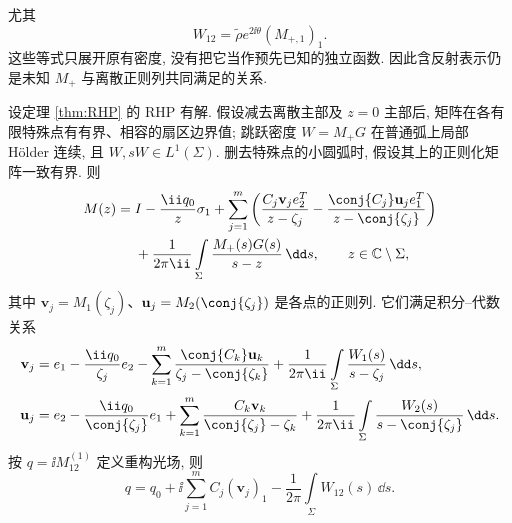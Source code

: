尤其
\[
W_{12}=\widetilde\rho e^{2\ii\theta}(M_{+,1})_1.
\]
这些等式只展开原有密度, 没有把它当作预先已知的独立函数.
因此含反射表示仍是未知 $M_+$ 与离散正则列共同满足的关系.
\begin{proposition}[含反射的留数积分表示]\label{prop:cauchy-representation}
设定理 \ref{thm:RHP} 的 RHP 有解. 假设减去离散主部及 $z=0$ 主部后, 矩阵在各有限特殊点有有界、相容的扇区边界值; 跳跃密度 $W=M_+G$ 在普通弧上局部 Hölder 连续, 且 $W,sW\in L^1(\Sigma)$. 删去特殊点的小圆弧时, 假设其上的正则化矩阵一致有界. 则
\begin{equation}\label{eq:general-cauchy}
\begin{aligned}
M(z)={}&I-\dfrac{\ii q_0}{z}\sigma_1
+\sum\limits_{j=1}^{m}\left(
\dfrac{C_j\mathbf v_je_2^T}{z-\zeta_j}
-\dfrac{\conj{C_j}\mathbf u_je_1^T}{z-\conj{\zeta_j}}\right)\\
&+\dfrac{1}{2\pi\ii}\int\limits_\Sigma\dfrac{M_+(s)G(s)}{s-z}\,\dd s,
\qquad z\in\mathbb C\mathbin{\backslash}\Sigma,
\end{aligned}
\end{equation}
其中 $\mathbf v_j=M_1(\zeta_j)$、$\mathbf u_j=M_2(\conj{\zeta_j})$ 是各点的正则列. 它们满足积分--代数关系
\begin{align}
\mathbf v_j={}&e_1-\dfrac{\ii q_0}{\zeta_j}e_2
-\sum\limits_{k=1}^{m}\dfrac{\conj{C_k}\mathbf u_k}{\zeta_j-\conj{\zeta_k}}
+\dfrac{1}{2\pi\ii}\int\limits_\Sigma\dfrac{W_1(s)}{s-\zeta_j}\,\dd s,
\label{eq:general-finite1}\\
\mathbf u_j={}&e_2-\dfrac{\ii q_0}{\conj{\zeta_j}}e_1
+\sum\limits_{k=1}^{m}\dfrac{C_k\mathbf v_k}{\conj{\zeta_j}-\zeta_k}
+\dfrac{1}{2\pi\ii}\int\limits_\Sigma\dfrac{W_2(s)}{s-\conj{\zeta_j}}\,\dd s.
\label{eq:general-finite2}
\end{align}
按 $q=\ii M^{(1)}_{12}$ 定义重构光场, 则
\begin{equation}\label{eq:qgeneral}
q=q_0+\ii\sum\limits_{j=1}^{m}C_j(\mathbf v_j)_1
-\dfrac{1}{2\pi}\int\limits_\Sigma W_{12}(s)\,\dd s.
\end{equation}
\end{proposition}
